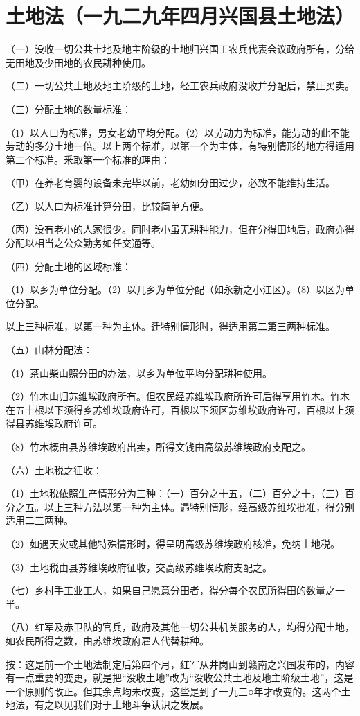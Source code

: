 \section[土地法（一九二九年四月兴国县土地法）]{土地法（一九二九年四月兴国县土地法）}


（一）没收一切公共土地及地主阶级的土地归兴国工农兵代表会议政府所有，分给无田地及少田地的农民耕种使用。

（二）一切公共土地及地主阶级的土地，经工农兵政府没收并分配后，禁止买卖。

（三）分配土地的数量标准：

（1）以人口为标准，男女老幼平均分配。（2）以劳动力为标准，能劳动的此不能劳动的多分土地一倍。以上两个标准，以第一个为主体，有特别情形的地方得适用第二个标准。釆取第一个标准的理由：

（甲）在养老育婴的设备未完毕以前，老幼如分田过少，必致不能维持生活。

（乙）以人口为标准计算分田，比较简单方便。

（丙）没有老小的人家很少。同时老小虽无耕种能力，但在分得田地后，政府亦得分配以相当之公众勤务如任交通等。

（四）分配土地的区域标准：

（1）以乡为单位分配。（2）以几乡为单位分配（如永新之小江区）。（8）以区为单位分配。

以上三种标准，以第一种为主体。迁特别情形时，得适用第二第三两种标准。

（五）山林分配法：

（1）茶山柴山照分田的办法，以乡为单位平均分配耕种使用。

（2）竹木山归苏维埃政府所有。但农民经苏维埃政府所许可后得享用竹木。竹木在五十根以下须得乡苏维埃政府许可，百根以下须区苏维埃政府许可，百根以上须得县苏维埃政府许可。

（8）竹木概由县苏维埃政府出卖，所得文钱由高级苏维埃政府支配之。

（六）土地税之征收：

（1）土地税依照生产情形分为三种：（一）百分之十五，（二）百分之十，（三）百分之五。以上三种方法以第一种为主体。遇特别情形，经高级苏维埃批准，得分别适用二三两种。

（2）如遇天灾或其他特殊情形时，得呈明高级苏维埃政府核准，免纳土地税。

（3）土地税由县苏维埃政府征收，交高级苏维埃政府支配之。

（七）乡村手工业工人，如果自己愿意分田者，得分每个农民所得田的数量之一半。

（八）红军及赤卫队的官兵，政府及其他一切公共机关服务的人，均得分配土地，如农民所得之数，由苏维埃政府雇人代替耕种。

按：这是前一个土地法制定后第四个月，红军从井岗山到赣南之兴国发布的，内容有一点重要的变更，就是把“没收土地”改为“没收公共土地及地主阶级土地”，这是一个原则的改正。但其余点均未改变，这些是到了一九三○年才改变的。这两个土地法，有之以见我们对于土地斗争认识之发展。


